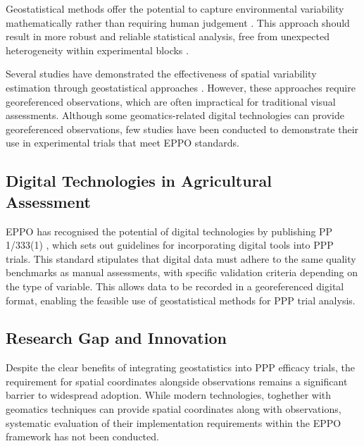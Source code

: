 \documentclass[12pt,a4paper,oneside]{report}
\begin{document}
Geostatistical methods offer the potential to capture environmental variability mathematically rather than requiring human judgement \cite{oliverGeostatisticalApplicationsPrecision2010,websterGeostatisticsEnvironmentalScientists2007}. This approach should result in more robust and reliable statistical analysis, free from unexpected heterogeneity within experimental blocks \cite{richterGeostatisticalModelsAgricultural2012,lopezEfficiencyIncompleteBlock1995}.

Several studies have demonstrated the effectiveness of spatial variability estimation through geostatistical approaches \cite{bullockDataIntensiveFarmManagement2019,castrignanoGeostatisticalApproachModelling2017,jinEfficientGeostatisticalAnalysis2021,puntelLeveragingDigitalAgriculture2024,trevisanSpatialVariabilityCrop2021}. However, these approaches require georeferenced observations, which are often impractical for traditional visual assessments. 
Although some geomatics-related digital technologies can provide georeferenced observations, few studies have been conducted to demonstrate their use in experimental trials that meet EPPO standards.

\subsection{Digital Technologies in Agricultural Assessment}

EPPO has recognised the potential of digital technologies by publishing PP 1/333(1) \cite{PP1333}, which sets out guidelines for incorporating digital tools into PPP trials. This standard stipulates that digital data must adhere to the same quality benchmarks as manual assessments, with specific validation criteria depending on the type of variable.
This allows data to be recorded in a georeferenced digital format, enabling the feasible use of geostatistical methods for PPP trial analysis.

\subsection{Research Gap and Innovation}

Despite the clear benefits of integrating geostatistics into PPP efficacy trials, the requirement for spatial coordinates alongside observations remains a significant barrier to widespread adoption. While modern technologies, toghether with geomatics techniques can provide spatial coordinates along with observations, systematic evaluation of their implementation requirements within the EPPO framework has not been conducted.
\end{document}
